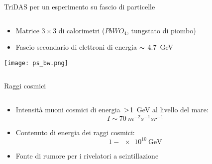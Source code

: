\documentclass[aspectratio=169]{beamer}
\begin{document}
  \begin{frame}{TriDAS per un esperimento su fascio di particelle}
      \begin{columns}[onlytextwidth,T]
      \begin{column}{.45\linewidth}
      \begin{itemize}
          \item Matrice $3 \times 3$ di calorimetri ($PbWO_4$, tungstato di piombo)
          \item Fascio secondario di elettroni di energia $\small\sim$ \SI{4.7}{\GeV}
      \end{itemize}
        \texttt{[image: ps\_bw.png]}
      \end{column}
      \begin{column}{.45\linewidth}
      \end{column}
    \end{columns}
  \end{frame}
  \begin{frame}{Raggi cosmici}
    
\begin{columns}[onlytextwidth,T]
  \begin{column}{.45\linewidth}
      \begin{itemize}
          \item Intensità muoni cosmici di \mbox{energia $\small>$\SI{1}{\GeV}} al livello del mare:
      $$
          I \sim 70\ m^{-2} s^{-1} sr^{-1}
      $$
          \item Contenuto di energia dei raggi cosmici:
      $$
      1 - \SI{e10}{\GeV}
      $$
          \item Fonte di rumore per i rivelatori a scintillazione
      \end{itemize}
  \end{column}
\end{columns}

  \end{frame}
\end{document}
